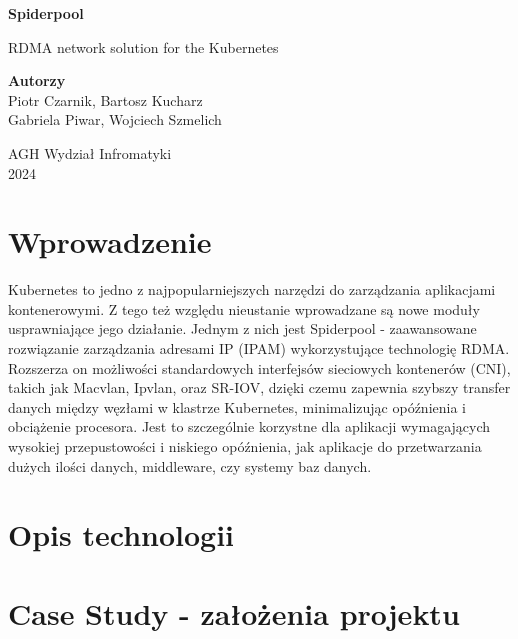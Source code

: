 \documentclass[onecolumn,12pt]{article}
\begin{document}
\begin{titlepage}
\begin{center}
\vspace*{2.5cm}
\Huge
\textbf{Spiderpool}
            
\vspace{0.5cm}
\LARGE
RDMA network solution for the Kubernetes
            
\vspace{1.5cm}

\textbf{Autorzy}
\large
\\Piotr Czarnik, Bartosz Kucharz
\\Gabriela Piwar, Wojciech Szmelich
              
\vspace{0.8cm}          
\Large
AGH Wydział Infromatyki\\
2024    
\end{center}
\end{titlepage}

\tableofcontents
\thispagestyle{empty}
\newpage

\section{Wprowadzenie}
Kubernetes to jedno z najpopularniejszych narzędzi do zarządzania aplikacjami kontenerowymi. Z tego też względu nieustanie wprowadzane są nowe moduły usprawniające jego działanie. Jednym z nich jest Spiderpool - zaawansowane rozwiązanie zarządzania adresami IP (IPAM) wykorzystujące technologię RDMA. Rozszerza on możliwości standardowych interfejsów sieciowych kontenerów (CNI), takich jak Macvlan, Ipvlan, oraz SR-IOV, dzięki czemu zapewnia  szybszy transfer danych między węzłami w klastrze Kubernetes, minimalizując opóźnienia i obciążenie procesora. Jest to szczególnie korzystne dla aplikacji wymagających wysokiej przepustowości i niskiego opóźnienia, jak aplikacje do przetwarzania dużych ilości danych, middleware, czy systemy baz danych.

\section{Opis technologii}

\section{Case Study - założenia projektu}
\end{document}
